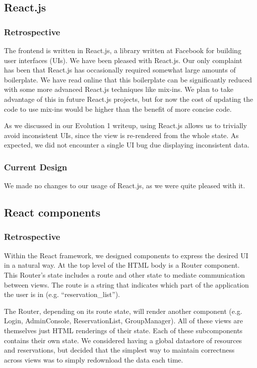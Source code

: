\documentclass[12pt]{article}
\begin{document}
\subsection{React.js}
\subsubsection{Retrospective}
The frontend is written in React.js, a library written at Facebook for building user interfaces (UIs). We have been pleased with React.js. Our only complaint has been that React.js has occasionally required somewhat large amounts of boilerplate. We have read online that this boilerplate can be significantly reduced with some more advanced React.js techniques like mix-ins. We plan to take advantage of this in future React.js projects, but for now the cost of updating the code to use mix-ins would be higher than the benefit of more concise code.

As we discussed in our Evolution 1 writeup, using React.js allows us to trivially avoid inconsistent UIs, since the view is re-rendered from the whole state. As expected, we did not encounter a single UI bug due displaying inconsistent data.

\subsubsection{Current Design}
We made no changes to our usage of React.js, as we were quite pleased with it.

\subsection{React components}
\subsubsection{Retrospective}
Within the React framework, we designed components to express the desired UI in a natural way. At the top level of the HTML body is a Router component. This Router's state includes a route and other state to mediate communication between views. The route is a string that indicates which part of the application the user is in (e.g. ``reservation\_list'').

The Router, depending on its route state, will render another component (e.g. Login, AdminConsole, ReservationList, GroupManager). All of these views are themselves just HTML renderings of their state. Each of these subcomponents contains their own state. We considered having a global datastore of resources and reservations, but decided that the simplest way to maintain correctness across views was to simply redownload the data each time.
\end{document}
